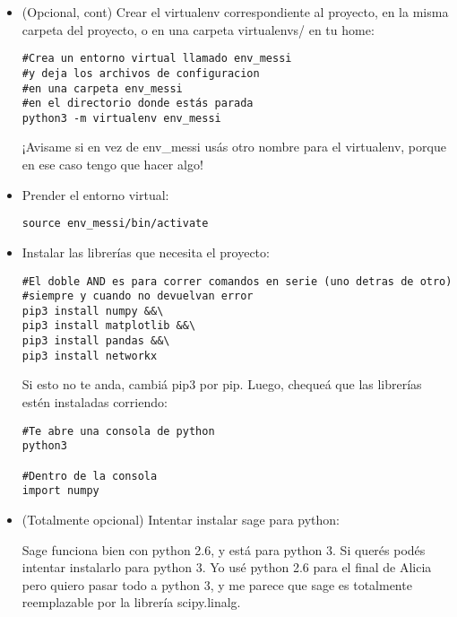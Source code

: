 \documentclass[10pt,a4paper]{report}
\begin{document}
\begin{itemize}
\item (Opcional, cont) Crear el virtualenv correspondiente al proyecto, en la misma carpeta del proyecto, o en una carpeta virtualenvs/ en tu home:

\begin{lstlisting}
#Crea un entorno virtual llamado env_messi
#y deja los archivos de configuracion
#en una carpeta env_messi
#en el directorio donde estás parada
python3 -m virtualenv env_messi
\end{lstlisting}

¡Avisame si en vez de env\_messi usás otro nombre para el virtualenv, porque en ese caso tengo que hacer algo!

\item Prender el entorno virtual:

\begin{lstlisting}
source env_messi/bin/activate
\end{lstlisting}

\item Instalar las librerías que necesita el proyecto:

\begin{lstlisting}
#El doble AND es para correr comandos en serie (uno detras de otro)
#siempre y cuando no devuelvan error
pip3 install numpy &&\
pip3 install matplotlib &&\
pip3 install pandas &&\
pip3 install networkx
\end{lstlisting}

Si esto no te anda, cambiá pip3 por pip. Luego, chequeá que las librerías estén instaladas corriendo:

\begin{lstlisting}
#Te abre una consola de python
python3

#Dentro de la consola
import numpy
\end{lstlisting}



\item (Totalmente opcional) Intentar instalar sage para python:


Sage funciona bien con python 2.6, y está  para python 3. Si querés podés intentar instalarlo para python 3. Yo usé python 2.6 para el final de Alicia pero quiero pasar todo a python 3, y me parece que sage es totalmente reemplazable por la librería scipy.linalg.


\end{itemize}
\end{document}
